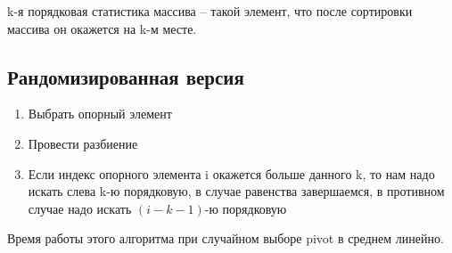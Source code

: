 \Def k-я порядковая статистика массива -- такой элемент, что после
сортировки массива он окажется на k-м месте.

\subsection*{Рандомизированная версия}

\begin{enumerate}
    \item Выбрать опорный элемент
    \item Провести разбиение
    \item Если индекс опорного элемента i окажется больше данного k, то нам надо искать слева k-ю порядковую, в случае равенства завершаемся, в противном случае надо искать $(i - k - 1)$-ю порядковую
\end{enumerate}

\Thbd Время работы этого алгоритма при случайном выборе pivot в среднем линейно.

\pagebreak